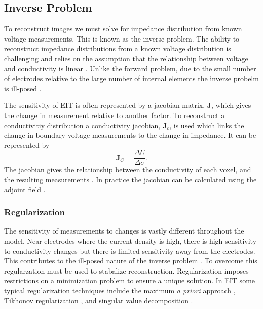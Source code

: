 \subsection{Inverse Problem}
To reconstruct images we must solve for impedance distribution from known voltage measurements. 
This is known as the inverse problem. 
The ability to reconstruct impedance distributions from a known voltage distribution is challenging 
and relies on the assumption that the relationship between voltage and conductivity is 
linear \parencite{barber_applied_1984}.
Unlike the forward problem, due to the small number of electrodes 
relative to the large number of internal elements the inverse probelm is
ill-posed \parencite{holder_electrical_2004}.

The sensitivity of EIT is often represented by a jacobian matrix, $\mathbf{J}$,
which gives the change in measurement relative to another factor. To reconstruct 
a conductivitiy distribution a conductivity jacobian, $\mathbf{J}_c$, is used
which links the change 
in boundary voltage measurements to the change in impedance. It can be represented by 
\begin{equation} \label{eq:jacobian_c}
	\mathbf{J}_C = \frac{\Delta U}{\Delta \sigma}. 
\end{equation}
The jacobian gives the relationship between the conductivity of each voxel, and the resulting
measurements \parencite{holder_electrical_2004}.
In practice the jacobian can be calculated using the adjoint 
field \parencite{vauhkonen_three-dimensional_1999}. 

\subsubsection{Regularization}
The sensitivity of measurements to changes is vastly different throughout the model. 
Near electrodes where the current density is high, there is high sensitivity to conductivity 
changes but there is limited sensitivity away from the electrodes. This contributes 
to the ill-posed nature of the inverse problem \parencite{holder_electrical_2004}.
To overcome this regularzation must be used to stabalize reconstruction. 
Regularization imposes restrictions on a minimization problem to ensure a unique solution.
In EIT some typical regularization techniques include the maximum \emph{a priori} approach
\parencite{adler_electrical_1996}, Tikhonov regularization \parencite{vauhkonen_tikhonov_1998},
and singular value decomposition \parencite{ostebee_rank-deficient_1998}.

